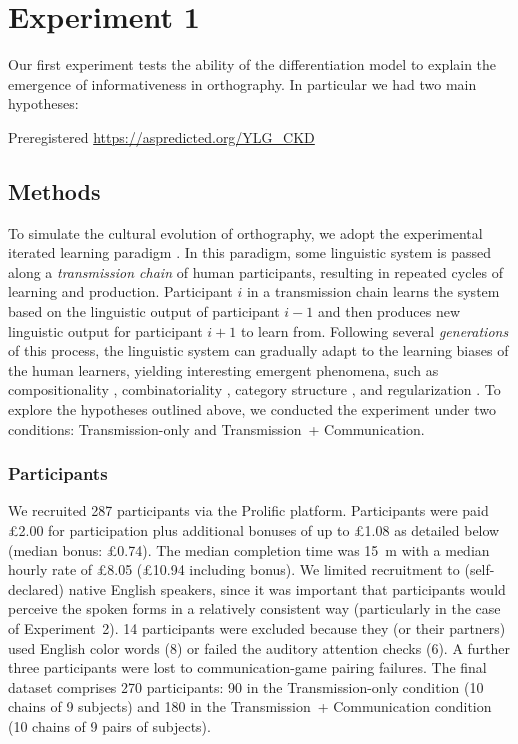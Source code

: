 \documentclass[doc,biblatex]{apa7}
\begin{document}

\section{Experiment 1}

Our first experiment tests the ability of the differentiation model to explain the emergence of informativeness in orthography. In particular we had two main hypotheses:


Preregistered \url{https://aspredicted.org/YLG_CKD}

\subsection{Methods}

To simulate the cultural evolution of orthography, we adopt the experimental iterated learning paradigm \parencite{Kirby:2008, Kirby:2015}. In this paradigm, some linguistic system is passed along a \textit{transmission chain} of human participants, resulting in repeated cycles of learning and production. Participant $i$ in a transmission chain learns the system based on the linguistic output of participant $i-1$ and then produces new linguistic output for participant $i+1$ to learn from. Following several \textit{generations} of this process, the linguistic system can gradually adapt to the learning biases of the human learners, yielding interesting emergent phenomena, such as compositionality \parencite{Kirby:2008, Kirby:2015}, combinatoriality \parencite{Verhoef:2015}, category structure \parencite{Carr:2017, Carr:2020}, and regularization \parencite{Smith:2010, Ferdinand:2019}. To explore the hypotheses outlined above, we conducted the experiment under two conditions: Transmission-only and Transmission~+ Communication.

\subsubsection{Participants}

We recruited 287 participants via the Prolific platform. Participants were paid £2.00 for participation plus additional bonuses of up to £1.08 as detailed below (median bonus: £0.74). The median completion time was 15~m with a median hourly rate of £8.05 (£10.94 including bonus). We limited recruitment to (self-declared) native English speakers, since it was important that participants would perceive the spoken forms in a relatively consistent way (particularly in the case of Experiment~2). 14 participants were excluded because they (or their partners) used English color words (8) or failed the auditory attention checks (6). A further three participants were lost to communication-game pairing failures. The final dataset comprises 270 participants: 90 in the Transmission-only condition (10 chains of 9 subjects) and 180 in the Transmission~+ Communication condition (10 chains of 9 pairs of subjects).
\end{document}

